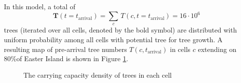 In this model, a total of 
\begin{equation}
\mathbf{T}(t=t_\text{arrival}) = \sum_{c} \, T(c,t=t_\text{arrival}) =  16 \cdot 10^6
\end{equation} 
trees (iterated over all cells, denoted by the bold symbol) are distributed with uniform probability among all cells with potential tree for tree growth. 
A resulting map of pre-arrival tree numbers $T(c,t_\text{arrival})$ in cells $c$ extending on $80\%$\TODO of Easter Island is shown in Figure \ref{fig:Map_tree}.

\begin{figure}
	\centering
	\caption{The carrying capacity density of trees in each cell}
	\label{fig:Map_tree}
\end{figure}

